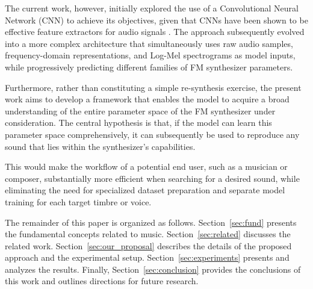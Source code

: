 \documentclass[10pt,conference]{IEEEtran}
\begin{document}
The current work, however, initially explored the use of a Convolutional Neural Network (CNN) to achieve its objectives, given that CNNs have been shown to be effective feature extractors for audio signals \cite{kiranyaz2021survey}. The approach subsequently evolved into a more complex architecture that simultaneously uses raw audio samples, frequency-domain representations, and Log-Mel spectrograms as model inputs, while progressively predicting different families of FM synthesizer parameters.

Furthermore, rather than constituting a simple re-synthesis exercise, the present work aims to develop a framework that enables the model to acquire a broad understanding of the entire parameter space of the FM synthesizer under consideration. The central hypothesis is that, if the model can learn this parameter space comprehensively, it can subsequently be used to reproduce any sound that lies within the synthesizer's capabilities.

This would make the workflow of a potential end user, such as a musician or composer, substantially more efficient when searching for a desired sound, while eliminating the need for specialized dataset preparation and separate model training for each target timbre or voice.

The remainder of this paper is organized as follows. Section~\ref{sec:fund} presents the fundamental concepts related to music. Section~\ref{sec:related} discusses the related work. Section~\ref{sec:our_proposal} describes the details of the proposed approach and the experimental setup. Section~\ref{sec:experiments} presents and analyzes the results. Finally, Section~\ref{sec:conclusion} provides the conclusions of this work and outlines directions for future research.



\end{document}
